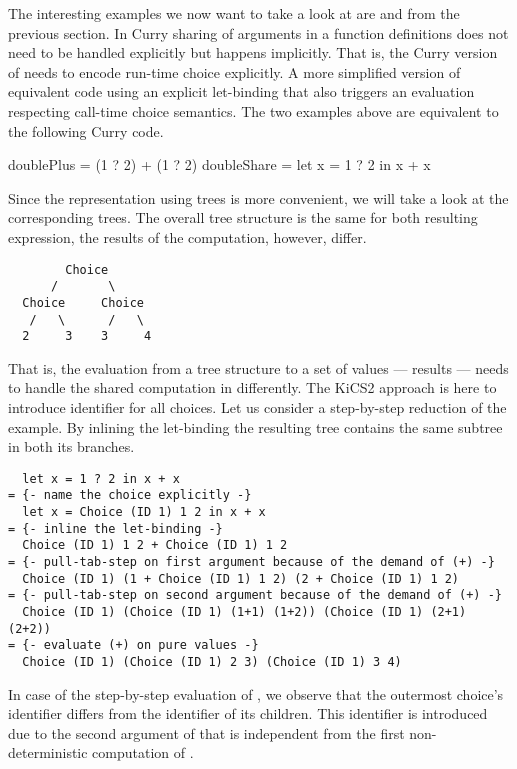 The interesting examples we now want to take a look at are
 and  from the
previous section.
In Curry sharing of arguments in a function definitions does not need
to be handled explicitly but happens implicitly.
That is, the Curry version of  needs to encode
run-time choice explicitly.
A more simplified version of equivalent code using an explicit
let-binding that also triggers an evaluation respecting call-time
choice semantics.
The two examples above are equivalent to the following Curry code.

\begin{curry}
doublePlus = (1 ? 2) + (1 ? 2)
doubleShare = let x = 1 ? 2 in x + x
\end{curry}

Since the representation using trees is more convenient, we will
take a look at the corresponding trees.
The overall tree structure is the same for both resulting expression,
the results of the computation, however, differ.

\begin{verbatim}
        Choice
      /       \
  Choice     Choice
   /   \      /   \
  2     3    3     4
\end{verbatim}

That is, the evaluation from a tree structure to a set of values ---
results --- needs to handle the shared computation in
\cinl{doubleShare} differently.
The KiCS2 approach is here to introduce identifier for all choices.
Let us consider a step-by-step reduction of the 
example.
By inlining the let-binding the resulting tree contains the same
subtree in both its branches.

\begin{verbatim}
  let x = 1 ? 2 in x + x
= {- name the choice explicitly -}
  let x = Choice (ID 1) 1 2 in x + x
= {- inline the let-binding -}
  Choice (ID 1) 1 2 + Choice (ID 1) 1 2
= {- pull-tab-step on first argument because of the demand of (+) -}
  Choice (ID 1) (1 + Choice (ID 1) 1 2) (2 + Choice (ID 1) 1 2)
= {- pull-tab-step on second argument because of the demand of (+) -}
  Choice (ID 1) (Choice (ID 1) (1+1) (1+2)) (Choice (ID 1) (2+1) (2+2))
= {- evaluate (+) on pure values -}
  Choice (ID 1) (Choice (ID 1) 2 3) (Choice (ID 1) 3 4)
\end{verbatim}

In case of the step-by-step evaluation of , we
observe that the outermost choice's identifier differs from the
identifier of its children.
This identifier is introduced due to the second argument of \cyinl{(+)}
that is independent from the first non-deterministic computation of
\cyinl{1 ? 2}.

